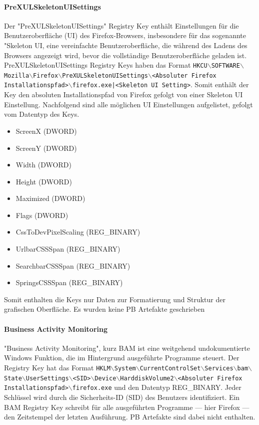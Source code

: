 \begin{appendices}
\paragraph*{PreXULSkeletonUISettings}
Der "PreXULSkeletonUISettings" Registry Key enthält Einstellungen für die Benutzeroberfläche (UI) des Firefox-Browsers, insbesondere für das sogenannte "Skeleton UI, eine vereinfachte Benutzeroberfläche, die während des Ladens des Browsers angezeigt wird, bevor die vollständige Benutzeroberfläche geladen ist. 
PreXULSkeletonUISettings Registry Keys haben das Format \texttt{HKCU$\backslash$SOFTWARE$\backslash$Mozilla$\backslash$Firefox$\backslash$PreXULSkeletonUISettings$\backslash$<Absoluter Firefox Installationspfad>$\backslash$firefox.exe|<Skeleton UI Setting>}.
Somit enthält der Key den absoluten Installationspfad von Firefox gefolgt von einer Skeleton UI Einstellung. Nachfolgend sind alle möglichen UI Einstellungen aufgelistet, gefolgt vom Datentyp des Keys.
\begin{itemize}
	\item ScreenX (DWORD)
	\item ScreenY (DWORD)
	\item Width (DWORD)
	\item Height (DWORD)
	\item Maximized (DWORD)
	\item Flags (DWORD)
	\item CssToDevPixelScaling (REG\_BINARY)
	\item UrlbarCSSSpan (REG\_BINARY)
	\item SearchbarCSSSpan (REG\_BINARY)
	\item SpringsCSSSpan (REG\_BINARY)
\end{itemize}
Somit enthalten die Keys nur Daten zur Formatierung und Struktur der grafischen Oberfläche. Es wurden keine PB Artefakte geschrieben

\paragraph*{Business Activity Monitoring}
"Business Activity Monitoring", kurz BAM ist eine weitgehend undokumentierte Windows Funktion, die im Hintergrund ausgeführte Programme steuert.
Der Registry Key hat das Format \texttt{HKLM$\backslash$System$\backslash$CurrentControlSet$\backslash$Services$\backslash$bam$\backslash$State$\backslash$UserSettings$\backslash$<SID>$\backslash$Device$\backslash$HarddiskVolume2$\backslash$<Absoluter Firefox Installationspfad>$\backslash$firefox.exe} und den Datentyp REG\_BINARY.
Jeder Schlüssel wird durch die Sicherheits-ID (SID) des Benutzers identifiziert.
Ein BAM Registry Key schreibt für alle ausgeführten Programme --- hier Firefox --- den Zeitstempel der letzten Ausführung.
PB Artefakte sind dabei nicht enthalten.


\end{appendices}
